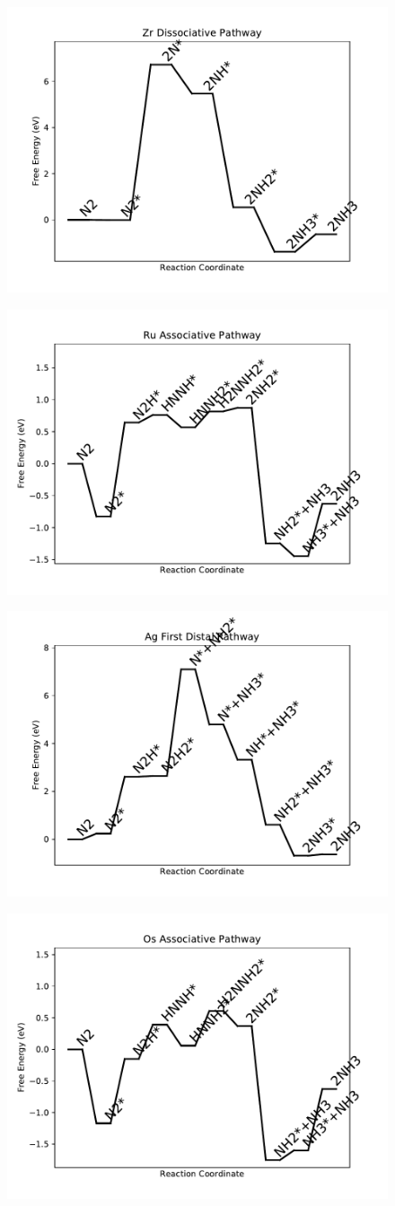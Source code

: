 \begin{figure}
\includegraphics[width=0.5\linewidth]{data/plots/Zr_dissociative.pdf}
\label{fig:Zr_dissociative}
\end{figure}

\begin{figure}
\includegraphics[width=0.5\linewidth]{data/plots/Ru_associative.pdf}
\label{fig:Ru_associative}
\end{figure}

\begin{figure}
\includegraphics[width=0.5\linewidth]{data/plots/Ag_distal_1.pdf}
\label{fig:Ag_distal_1}
\end{figure}

\begin{figure}
\includegraphics[width=0.5\linewidth]{data/plots/Os_associative.pdf}
\label{fig:Os_associative}
\end{figure}

